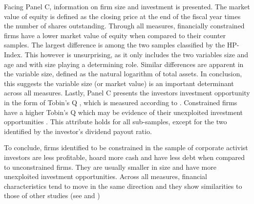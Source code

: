 \documentclass[12pt]{article}
\begin{document}
Facing Panel C, information on firm size and investment is presented. The market value of equity is defined as the closing price at the end of the fiscal year times the number of shares outstanding. Through all measures, financially constrained firms have a lower market value of equity when compared to their counter samples. The largest difference is among the two samples classified by the HP-Index. This however is unsurprising, as it only includes the two variables size and age and with size playing a determining role. Similar differences are apparent in the variable size, defined as the natural logarithm of total assets. In conclusion, this suggests the variable size (or market value) is an important determinant across all measures. Lastly, Panel C presents the investors investment opportunity in the form of Tobin's Q \citep[p.1441]{MacKay2005}, which is measured according to \citet[p.1]{Khatami2014}. Constrained firms have a higher Tobin's Q which may be evidence of their unexploited investment opportunities \citep[p.539]{Whited2006}. This attribute holds for all sub-samples, except for the two identified by the investor's dividend payout ratio. 


To conclude, firms identified to be constrained in the sample of corporate activist investors are less profitable, hoard more cash and have less debt when compared to unconstrained firms. They are usually smaller in size and have more unexploited investment opportunities. Across all measures, financial characteristics tend to move in the same direction and they show similarities to those of other studies (see \citet[p.544]{Whited2006} and \citet[p.1917]{hadlock2010})
\end{document}
